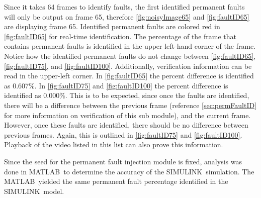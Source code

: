 \par Since it takes 64 frames to identify faults, the first identified permanent faults will only be output on frame 65, therefore \autoref{fig:noisyImage65} and \autoref{fig:faultID65} are displaying frame 65. Identified permanent faults are colored red in \autoref{fig:faultID65} for real-time identification. The percentage of the frame that contains permanent faults is identified in the upper left-hand corner of the frame. Notice how the identified permanent faults do not change between \autoref{fig:faultID65}, \autoref{fig:faultID75}, and \autoref{fig:faultID100}. Additionally, verification information can be read in the upper-left corner. In \autoref{fig:faultID65} the percent difference is identified as 0.607\%. In \autoref{fig:faultID75} and \autoref{fig:faultID100} the percent difference is identified as 0.000\%. This is to be expected, since once the faults are identified, there will be a difference between the previous frame (reference \autoref{sec:permFaultID} for more information on verification of this sub module), and the current frame. However, once these faults are identified, there should be no difference between previous frames. Again, this is outlined in \autoref{fig:faultID75} and \autoref{fig:faultID100}. Playback of the video listed in this \hyperref[list:urlList]{list} can also prove this information.
\par Since the seed for the permanent fault injection module is fixed, analysis was done in MATLAB\textregisteredmark\ to determine the accuracy of the SIMULINK\textregisteredmark\ simulation. The MATLAB\textregisteredmark\ yielded the same permanent fault percentage identified in the SIMULINK\textregisteredmark\ model.